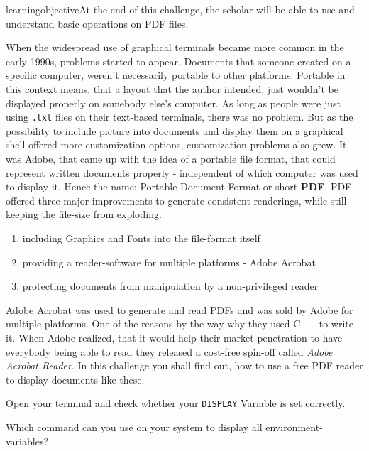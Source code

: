 learningobjective{At the end of this challenge, the scholar will be able to use and understand basic operations on PDF files. }
\begin{challenge}
    \begin{chadescription}
    When the widespread use of graphical terminals became more common in the early 1990s, problems started to appear. Documents that someone created on a specific computer, weren't necessarily portable to other platforms. Portable in this context means, that a layout that the author intended, just wouldn't be displayed properly on somebody else's computer. As long as people were just using \texttt{.txt} files on their text-based terminals, there was no problem. But as the possibility to include picture into documents and display them on a graphical shell offered more customization options, customization problems also grew. It was Adobe, that came up with the idea of a portable file format, that could represent written documents properly - independent of which computer was used to display it. Hence the name: Portable Document Format or short \textbf{PDF}. PDF offered three major improvements to generate consistent renderings, while still keeping the file-size from exploding.
    \begin{enumerate}
        \item including Graphics and Fonts into the file-format itself
        \item providing a reader-software for multiple platforms - Adobe Acrobat
        \item protecting documents from manipulation by a non-privileged reader
    \end{enumerate}
    Adobe Acrobat was used to generate and read PDFs and was sold by Adobe for multiple platforms. One of the reasons by the way why they used C++ to write it. When Adobe realized, that it would help their market penetration to have everybody being able to read they released a cost-free spin-off called \textit{Adobe Acrobat Reader}. In this challenge you shall find out, how to use a free PDF reader to display documents like these.
    \end{chadescription}
    \begin{task}
    Open your terminal and check whether your \texttt{DISPLAY} Variable is set correctly.
    \begin{questions}
        \item Which command can you use on your system to display all environment-variables?

\end{questions}
\end{task}
\end{challenge}
